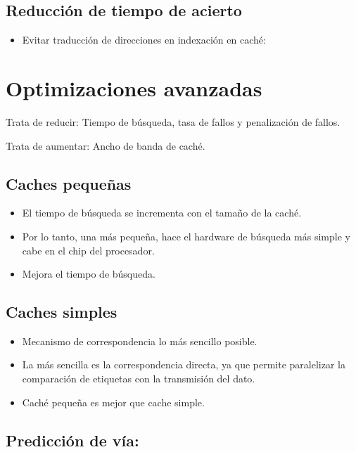 \documentclass[12pt, twoside, openright]{report} %
\begin{document}
\subsection{Reducción de tiempo de acierto}

\begin{itemize}

	\item Evitar traducción de direcciones en indexación en caché:
\end{itemize}

\section{Optimizaciones avanzadas}

Trata de reducir: Tiempo de búsqueda, tasa de fallos y penalización
de fallos.

Trata de aumentar: Ancho de banda de caché.

\subsection{Caches pequeñas}

\begin{itemize}

	\item El tiempo de búsqueda se incrementa con el tamaño de la caché.
	\item Por lo tanto, una más pequeña, hace el hardware de búsqueda más
	      simple y cabe en el chip del procesador.
	\item Mejora el tiempo de búsqueda.
\end{itemize}

\subsection{Caches simples}

\begin{itemize}

	\item Mecanismo de correspondencia lo más sencillo posible.
	\item La más sencilla es la correspondencia directa, ya que permite
	      paralelizar la comparación de etiquetas con la transmisión del
	      dato.
	\item Caché pequeña es mejor que cache simple.
\end{itemize}
\subsection{Predicción de vía:}
\end{document}
